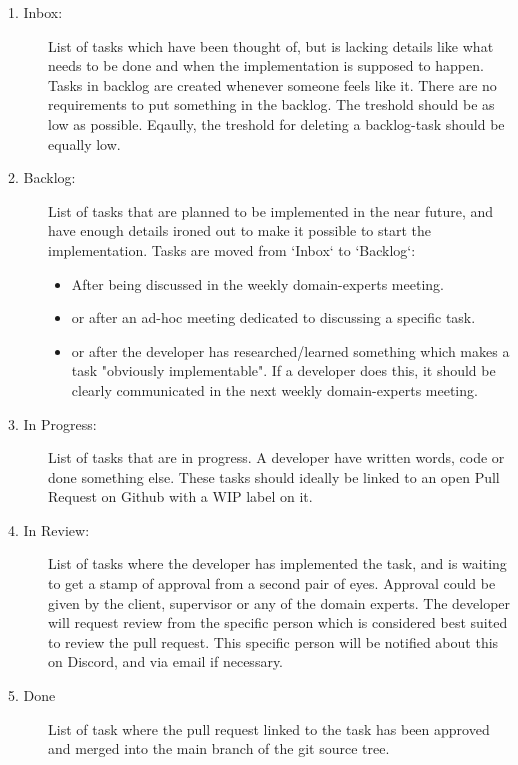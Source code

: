 \begin{description}
    
    \item[1. Inbox:] List of tasks which have been thought of, but is lacking details like what needs to be done and when the implementation is supposed to happen. Tasks in backlog are created whenever someone feels like it. There are no requirements to put something in the backlog. The treshold should be as low as possible. Eqaully, the treshold for deleting a backlog-task should be equally low.
    
    \item[2. Backlog:] List of tasks that are planned to be implemented in the near future, and have enough details ironed out to make it possible to start the implementation. Tasks are moved from `Inbox` to `Backlog`:
        \begin{itemize}
            \item After being discussed in the weekly domain-experts meeting.
            \item or after an ad-hoc meeting dedicated to discussing a specific task.
            \item or after the developer has researched/learned something which makes a task "obviously implementable". If a developer does this, it should be clearly communicated in the next weekly domain-experts meeting.
        \end{itemize}

    \item[3. In Progress:] List of tasks that are in progress. A developer have written words, code or done something else. These tasks should ideally be linked to an open Pull Request on Github with a WIP label on it.

    \item[4. In Review:] List of tasks where the developer has implemented the task, and is waiting to get a stamp of approval from a second pair of eyes. Approval could be given by the client, supervisor or any of the domain experts. The developer will request review from the specific person which is considered best suited to review the pull request. This specific person will be notified about this on Discord, and via email if necessary.

    \item[5. Done] List of task where the pull request linked to the task has been approved and merged into the main branch of the git source tree.

\end{description}


